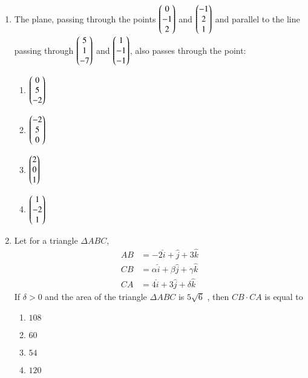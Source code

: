 \documentclass[journal]{IEEEtran}
\theoremstyle{remark}
\begin{document}
\begin{enumerate}
\item The plane, passing through the points $\begin{pmatrix}0\\ -1\\ 2\end{pmatrix}$ and $\begin{pmatrix}-1\\ 2\\ 1\end{pmatrix}$ and parallel to the line passing through $\begin{pmatrix}5\\1\\-7\end{pmatrix}$ and $\begin{pmatrix}1\\-1\\-1\end{pmatrix}$, also passes through the point:\hfill{}

\begin{multicols}{4}
\begin{enumerate}
\item $\begin{pmatrix}0\\5\\-2\end{pmatrix}$
\item $\begin{pmatrix}-2\\5\\0\end{pmatrix}$
\item $\begin{pmatrix}2\\0\\1\end{pmatrix}$
\item $\begin{pmatrix}1\\-2\\1\end{pmatrix}$
\end{enumerate}
\end{multicols}

\item Let for a triangle $\Delta ABC$,
\begin{align*}
AB &= -2\hat{i} +\hat{j} +3\hat{k} \\
CB &= \alpha \hat{i} +\beta \hat{j} +\gamma \hat{k}\\
CA &= 4\hat{i} +3\hat{j} +\delta \hat{k}
\end{align*}
If $\delta >0$ and the area of the triangle $\Delta ABC$ is $5\sqrt{6}$ , then $CB \cdot CA $ is equal to
	
		\hfill{}

\begin{multicols}{4}
\begin{enumerate}
\item $108$
\item $60$
\item $54$
\item $120$
\end{enumerate}
\end{multicols}


\end{enumerate}
\end{document}
